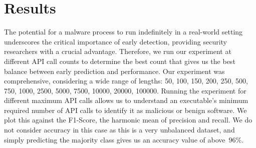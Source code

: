 \section{Results}
\label{sec:results}
The potential for a malware process to run indefinitely in a real-world setting underscores the critical importance of early detection, providing security researchers with a crucial advantage.
Therefore, we run our experiment at different API call counts to determine the best count that gives us the best balance between early prediction and performance.
Our experiment was comprehensive, considering a wide range of lengths: {50, 100, 150, 200, 250, 500, 750, 1000, 2500, 5000, 7500, 10000, 20000, 100000}.
Running the experiment for different maximum API calls allows us to understand an executable's minimum required number of API calls to identify it as malicious or benign software.
We plot this against the F1-Score, the harmonic mean of precision and recall. 
We do not consider accuracy in this case as this is a very unbalanced dataset, and simply predicting the majority class gives us an accuracy value of above~$96\%$.

